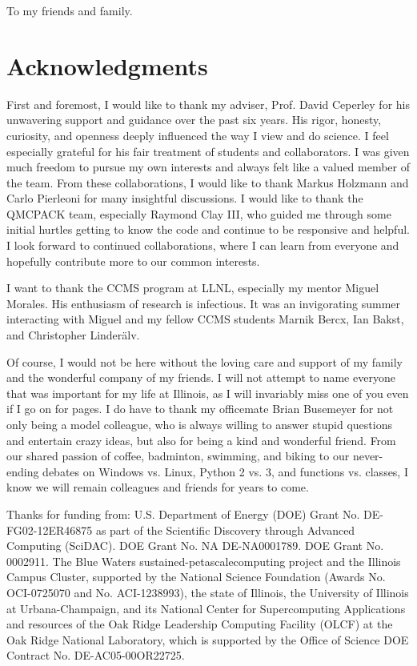 \begin{dedication}
To my friends and family.
\end{dedication}

\chapter*{Acknowledgments}
First and foremost, I would like to thank my adviser, Prof. David Ceperley for his unwavering support and guidance over the past six years.
His rigor, honesty, curiosity, and openness deeply influenced the way I view and do science.
I feel especially grateful for his fair treatment of students and collaborators.
I was given much freedom to pursue my own interests and always felt like a valued member of the team.
From these collaborations, I would like to thank Markus Holzmann and Carlo Pierleoni for many insightful discussions.
I would like to thank the QMCPACK team, especially Raymond Clay III, who guided me through some initial hurtles getting to know the code and continue to be responsive and helpful.
I look forward to continued collaborations, where I can learn from everyone and hopefully contribute more to our common interests.

I want to thank the CCMS program at LLNL, especially my mentor Miguel Morales.
His enthusiasm of research is infectious.
It was an invigorating summer interacting with Miguel and my fellow CCMS students Marnik Bercx, Ian Bakst, and Christopher Linder\"alv.

Of course, I would not be here without the loving care and support of my family and the wonderful company of my friends. I will not attempt to name everyone that was important for my life at Illinois, as I will invariably miss one of you even if I go on for pages.
I do have to thank my officemate Brian Busemeyer for not only being a model colleague, who is always willing to answer stupid questions and entertain crazy ideas, but also for being a kind and wonderful friend.
From our shared passion of coffee, badminton, swimming, and biking to our never-ending debates on Windows vs. Linux, Python 2 vs. 3, and functions vs. classes, I know we will remain colleagues and friends for years to come.

Thanks for funding from:
U.S. Department of Energy (DOE) Grant No. DE-FG02-12ER46875 as part of the Scientific Discovery through Advanced Computing (SciDAC). DOE Grant No. NA DE-NA0001789. DOE Grant No. 0002911. The Blue Waters sustained-petascalecomputing project and the Illinois Campus Cluster, supported by the National Science Foundation (Awards No. OCI-0725070 and No. ACI-1238993), the state of Illinois, the University of Illinois at Urbana-Champaign, and its National Center for Supercomputing Applications and resources of the Oak Ridge Leadership Computing Facility (OLCF) at the Oak  Ridge National Laboratory, which is supported by the Office of Science DOE Contract No. DE-AC05-00OR22725.
